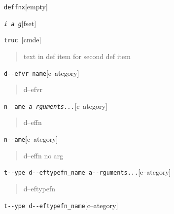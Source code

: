 \documentclass{book}
\newcommand\GNUTexinfocommandstyletextvar[1]{{\normalfont{}\textsl{#1}}}%
\begin{document}
%
\noindent\texttt{deffnx}\hfill[empty]



%

\noindent\texttt{\GNUTexinfocommandstyletextvar{i} \EmbracOn{}\textnormal{\textsl{a g}}\EmbracOff{}}\hfill[fset]



\index[fn]{i@\texttt{\GNUTexinfocommandstyletextvar{i}}}%
\noindent\texttt{truc \EmbracOn{}\textnormal{\textsl{}}\EmbracOff{}}\hfill[cmde]



%
\begin{quote}
\unskip{\parskip=0pt\noindent}%
text in def item for second def item
\end{quote}


\noindent\texttt{d{-}{-}efvr\_name}\hfill[c--ategory]



%
\begin{quote}
\unskip{\parskip=0pt\noindent}%
d--efvr
\end{quote}

\noindent\texttt{n{-}{-}ame \EmbracOn{}\textnormal{\textsl{a--rguments...}}\EmbracOff{}}\hfill[c--ategory]



%
\begin{quote}
\unskip{\parskip=0pt\noindent}%
d--effn
\end{quote}

\noindent\texttt{n{-}{-}ame}\hfill[c--ategory]



%
\begin{quote}
\unskip{\parskip=0pt\noindent}%
d--effn no arg
\end{quote}

\noindent\texttt{t{-}{-}ype d{-}{-}eftypefn\_name a{-}{-}rguments...}\hfill[c--ategory]



%
\begin{quote}
\unskip{\parskip=0pt\noindent}%
d--eftypefn
\end{quote}

\noindent\texttt{t{-}{-}ype d{-}{-}eftypefn\_name}\hfill[c--ategory]
\end{document}
